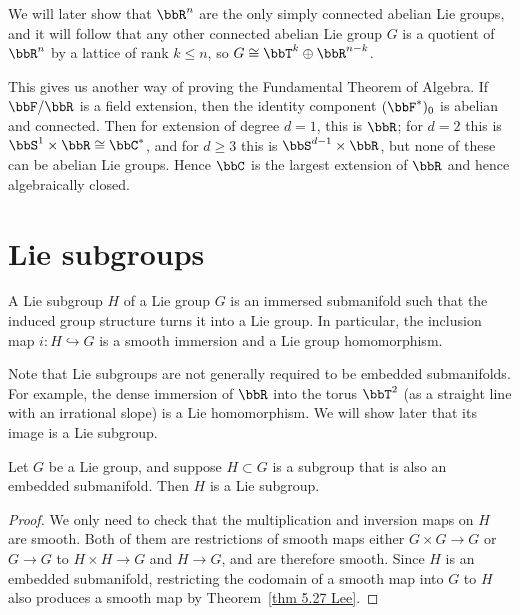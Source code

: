 \begin{rem}
    We will later show that $\bbR^n$ are the only simply connected abelian Lie groups, and it will follow that any other connected abelian Lie group $G$ is a quotient of $\bbR^n$ by a lattice of rank $k\leq n$, so $G\cong \bbT^k\oplus \bbR^{n-k}$.
    
    This gives us another way of proving the Fundamental Theorem of Algebra. If $\bbF/\bbR$ is a field extension, then the identity component $(\bbF^\ast)_0$ is abelian and connected. Then for extension of degree $d=1$, this is $\bbR$; for $d=2$ this is $\bbS^1\times\bbR\cong\bbC^\ast$, and for $d\geq 3$ this is $\bbS^{d-1}\times\bbR$, but none of these can be abelian Lie groups. Hence $\bbC$ is the largest extension of $\bbR$ and hence algebraically closed.
\end{rem}





\section{Lie subgroups}

\begin{defn}
    A Lie subgroup $H$ of a Lie group $G$ is an immersed submanifold such that the induced group structure turns it into a Lie group. In particular, the inclusion map $i:H\hookrightarrow G$ is a smooth immersion and a Lie group homomorphism.
\end{defn}

Note that Lie subgroups are not generally required to be embedded submanifolds. For example, the dense immersion of $\bbR$ into the torus $\bbT^2$ (as a straight line with an irrational slope) is a Lie homomorphism. We will show later that its image is a Lie subgroup.

\begin{prop}\label{prop 7.11 Lee}
    Let $G$ be a Lie group, and suppose $H\subset G$ is a subgroup that is also an embedded submanifold. Then $H$ is a Lie subgroup.
\end{prop}
\begin{proof}
    We only need to check that the multiplication and inversion maps on $H$ are smooth. Both of them are restrictions of smooth maps either $G\times G\to G$ or $G\to G$ to $H\times H\to G$ and $H\to G$, and are therefore smooth. Since $H$ is an embedded submanifold, restricting the codomain of a smooth map into $G$ to $H$ also produces a smooth map by Theorem~\ref{thm 5.27 Lee}.
\end{proof}

